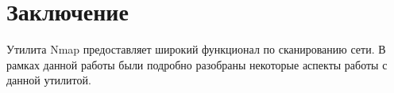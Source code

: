 \section{Заключение}

Утилита Nmap предоставляет широкий функционал по сканированию сети. В рамках данной работы были подробно разобраны некоторые аспекты 
работы с данной утилитой. 